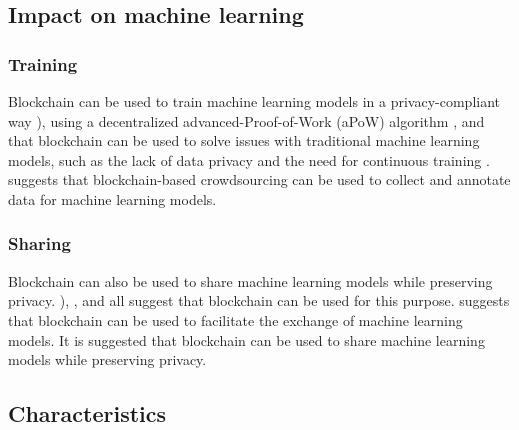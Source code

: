 \documentclass{article}
\begin{document}
\subsection{Impact on machine learning}

\subsubsection{Training}
Blockchain can be used to train machine learning models in a privacy-compliant way \cite{ladia_2019}), using a decentralized advanced-Proof-of-Work (aPoW) algorithm \cite{kusi_2020}, and that blockchain can be used to solve issues with traditional machine learning models, such as the lack of data privacy and the need for continuous training \cite{ding_2022}. \cite{xu_2022} suggests that blockchain-based crowdsourcing can be used to collect and annotate data for machine learning models.

\subsubsection{Sharing}
Blockchain can also be used to share machine learning models while preserving privacy. \cite{ladia_2019}), \cite{lu_2020}, and \cite{lee_2021} all suggest that blockchain can be used for this purpose. \cite{kurtulmus_2018} suggests that blockchain can be used to facilitate the exchange of machine learning models. It is suggested that blockchain can be used to share machine learning models while preserving privacy.

\subsection{Characteristics}
\end{document}
